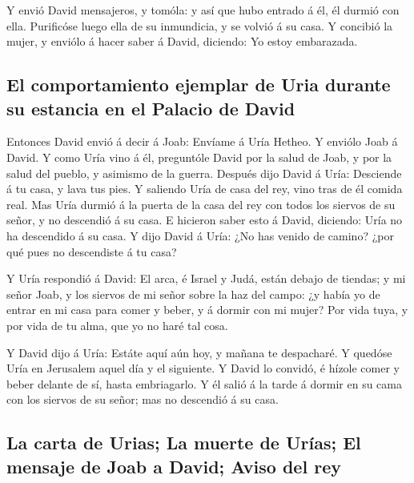  Y envió David mensajeros, y tomóla: y así que hubo entrado
á él, él durmió con ella. Purificóse luego ella de su inmundicia, y se
volvió á su casa.  Y concibió la mujer, y enviólo á hacer
saber á David, diciendo: Yo estoy embarazada.

\hypertarget{el-comportamiento-ejemplar-de-uria-durante-su-estancia-en-el-palacio-de-david}{%
\subsection{El comportamiento ejemplar de Uria durante su estancia en el
Palacio de
David}\label{el-comportamiento-ejemplar-de-uria-durante-su-estancia-en-el-palacio-de-david}}

 Entonces David envió á decir á Joab: Envíame á Uría Hetheo.
Y enviólo Joab á David.  Y como Uría vino á él, preguntóle
David por la salud de Joab, y por la salud del pueblo, y asimismo de la
guerra.  Después dijo David á Uría: Desciende á tu casa, y
lava tus pies. Y saliendo Uría de casa del rey, vino tras de él comida
real.  Mas Uría durmió á la puerta de la casa del rey con
todos los siervos de su señor, y no descendió á su casa.  E
hicieron saber esto á David, diciendo: Uría no ha descendido á su casa.
Y dijo David á Uría: ¿No has venido de camino? ¿por qué pues no
descendiste á tu casa?

 Y Uría respondió á David: El arca, é Israel y Judá, están
debajo de tiendas; y mi señor Joab, y los siervos de mi señor sobre la
haz del campo: ¿y había yo de entrar en mi casa para comer y beber, y á
dormir con mi mujer? Por vida tuya, y por vida de tu alma, que yo no
haré tal cosa.

 Y David dijo á Uría: Estáte aquí aún hoy, y mañana te
despacharé. Y quedóse Uría en Jerusalem aquel día y el siguiente.
 Y David lo convidó, é hízole comer y beber delante de sí,
hasta embriagarlo. Y él salió á la tarde á dormir en su cama con los
siervos de su señor; mas no descendió á su casa.

\hypertarget{la-carta-de-urias-la-muerte-de-uruxedas-el-mensaje-de-joab-a-david-aviso-del-rey}{%
\subsection{La carta de Urias; La muerte de Urías; El mensaje de Joab a
David; Aviso del
rey}\label{la-carta-de-urias-la-muerte-de-uruxedas-el-mensaje-de-joab-a-david-aviso-del-rey}}

